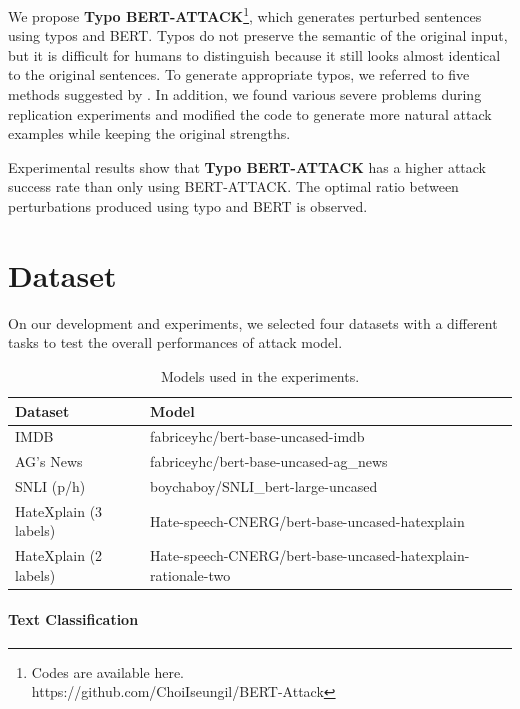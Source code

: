 \documentclass[11pt,a4paper]{article}
\begin{document}
We propose \textbf{Typo BERT-ATTACK}\footnote{Codes are available here.\\https://github.com/ChoiIseungil/BERT-Attack}, which generates perturbed sentences using typos and BERT. Typos do not preserve the semantic of the original input, but it is difficult for humans to distinguish because it still looks almost identical to the original sentences. To generate appropriate typos, we referred to five methods suggested by \citet{Hagen:17}. In addition, we found various severe problems during replication experiments and modified the code to generate more natural attack examples while keeping the original strengths. 

Experimental results show that \textbf{Typo BERT-ATTACK} has a higher attack success rate than only using BERT-ATTACK. The optimal ratio between perturbations produced using typo and BERT is observed. 

\section{Dataset}

On our development and experiments, we selected four datasets with a different tasks to test the overall performances of attack model. 
\begin{table}[]
\centering
\begin{tabular}{ll}
\hline \textbf{Dataset} & \textbf{Model} \\ \hline
IMDB                  & fabriceyhc/bert-base-uncased-imdb \\
AG's News             & fabriceyhc/bert-base-uncased-ag\_news  \\
SNLI (p/h)            & boychaboy/SNLI\_bert-large-uncased  \\
HateXplain (3 labels) & Hate-speech-CNERG/bert-base-uncased-hatexplain \\
HateXplain (2 labels) & Hate-speech-CNERG/bert-base-uncased-hatexplain-rationale-two \\
\hline
\end{tabular}
\caption{\label{Model-table} Models used in the experiments. }
\end{table}

\paragraph{Text Classification}
\end{document}
